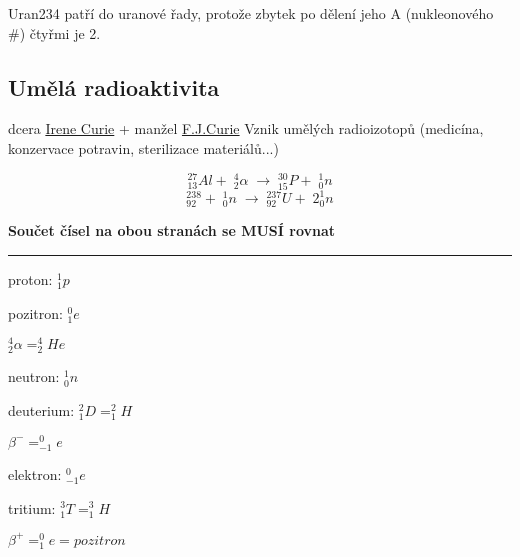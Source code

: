 Uran234 patří do uranové řady, protože zbytek po dělení jeho A (nukleonového \#) čtyřmi je 2.

\subsection{Umělá radioaktivita}
dcera \underline{Irene Curie} + manžel \underline{F.J.Curie}
Vznik umělých radioizotopů (medicína, konzervace potravin, sterilizace materiálů...)

\[^{27}_{13}Al + \; ^4_2\alpha \; \longrightarrow \; ^{30}_{15}P + \; ^1_0n\]
\vspace{1em}
\[^{238}_{92} +  \; ^1_0n \; \longrightarrow \; ^{237}_{92}U + \; 2^1_0n\]
\vspace{0.5em}

\textbf{Součet čísel na obou stranách se MUSÍ rovnat}

\rule{44em}{1px}

\begin{multicols}{3}
    \vspace{0.5em}
    proton: $^1_1p$
    
    \vspace{0.5em}
    pozitron: $^0_1e$
    
    \vspace{0.5em}
    $^4_2\alpha = ^4_2He$
    
    \vspace{0.5em}
    neutron: $^1_0n$
    
    deuterium: $^2_1D = ^2_1H$
    
    $\beta^{-} = ^0_{-1}e$
    
    elektron: $^0_{-1}e$
    
    tritium: $^3_1T = ^3_1H$
    
    $\beta^{+} = ^0_1e = pozitron$
\end{multicols}